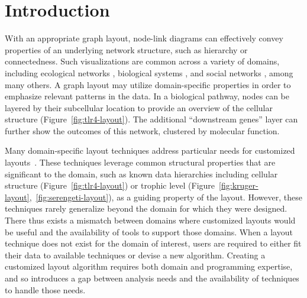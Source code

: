\section{Introduction}
With an appropriate graph layout, node-link diagrams can
effectively convey properties of an underlying
network structure, such as hierarchy or connectedness. Such visualizations
are common across a variety of domains, including ecological networks
\cite{hinke2004visualizing,harper2006dynamic,lavigne1996cod,baskerville2011spatial,yodzis1998local,cohen2003ecological,kearney2016blog,benson2016higher,kruger2017},
biological systems
\cite{barsky2008cerebral,shannon2003cytoscape,gehlenborg2010visualization,saraiya2005visualizing,becker2001graph},
and social networks
\cite{scott1988social,rothenberg1998using,fitzpatrick2001preventable,mcelroy2003network,fu2011hiv}, 
among many others. A graph layout may utilize
domain-specific properties in order to emphasize relevant patterns in the
data. 
In a biological pathway, nodes can be layered by their
subcellular location to provide an overview of the cellular structure
(Figure~\ref{fig:tlr4-layout}). The additional ``downstream genes'' layer
can further show the outcomes of this network, clustered by molecular function.

\tlrfourLayout

Many domain-specific layout techniques address particular needs
for customized layouts~\cite{barsky2008cerebral,genc2003constrained,shannon2003cytoscape,kearney2017d3,kearney2017ecopath}. These
techniques leverage common structural properties that are significant to the
domain, such as known data hierarchies including cellular 
structure (Figure~\ref{fig:tlr4-layout}) or trophic level
(Figure~\ref{fig:kruger-layout},~\ref{fig:serengeti-layout}), as a guiding property of the
layout. However, these techniques rarely generalize beyond the domain for
which they were designed. There thus exists a mismatch between domains
where customized layouts would be useful and the availability of tools to
support those domains. When a layout technique does not exist for the
domain of interest, users are required to either fit their data
to available techniques or devise a new algorithm. Creating a
customized layout algorithm requires both
domain and programming expertise, and so introduces a gap between 
analysis needs and the availability of techniques to
handle those needs.

